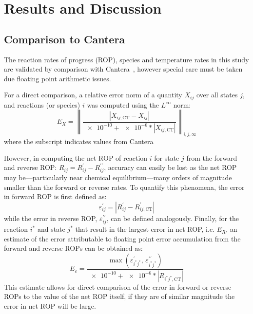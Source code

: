 \documentclass[12pt,number,sort&compress]{elsarticle}
\begin{document}
\section{Results and Discussion}
\subsection{Comparison to Cantera}
The reaction rates of progress (ROP), species and temperature rates in this study are validated by comparison with Cantera~\cite{Cantera}, however special care must be taken due floating point arithmetic issues.

For a direct comparison, a relative error norm of a quantity $X_{ij}$ over all states $j$, and reactions (or species) $i$ was computed using the $L^{\infty}$ norm:
\begin{equation}
E_{X} = \left\lVert \frac{\left\lvert X_{ij,\text{CT}} - X_{ij}\right\rvert}{\num{e-10} + \num{e-6} * \left\lvert X_{ij,\text{CT}} \right\rvert} \right\rVert_{i,j,\infty}
\label{e:rel_err}
\end{equation}
where the  subscript indicates values from Cantera~\cite{Cantera}

However, in computing the net ROP of reaction $i$ for state $j$ from the forward and reverse ROP: $R_{ij} = R_{ij}^{\prime} - R_{ij}^{\prime\prime}$, accuracy can easily be lost as the net ROP may be---particularly near chemical equilibrium---many orders of magnitude smaller than the forward or reverse rates.
To quantify this phenomena, the error in forward ROP is first defined as:
\begin{equation}
\varepsilon^{\prime}_{ij} = \left\lvert R_{ij}^{\prime} - R_{ij,\text{CT}}^{\prime} \right\rvert
\end{equation}
while the error in reverse ROP, $\varepsilon^{\prime\prime}_{ij}$, can be defined analogously.
Finally, for the reaction $i^{*}$ and state $j^{*}$ that result in the largest error in net ROP, i.e. $E_{R}$, an estimate of the error attributable to floating point error accumulation from the forward and reverse ROPs can be obtained as:
\begin{equation}
E_{\varepsilon} = \frac{\max(\varepsilon^{\prime}_{i^{*}j^{*}}\text{, }\varepsilon^{\prime\prime}_{i^{*}j^{*}})}{\num{e-10} + \num{e-6} * \left\lvert R_{i^{*}j^{*},\text{CT}} \right\rvert}
\end{equation}
This estimate allows for direct comparison of the error in forward or reverse ROPs to the value of the net ROP itself, if they are of similar magnitude the error in net ROP will be large.
\end{document}
